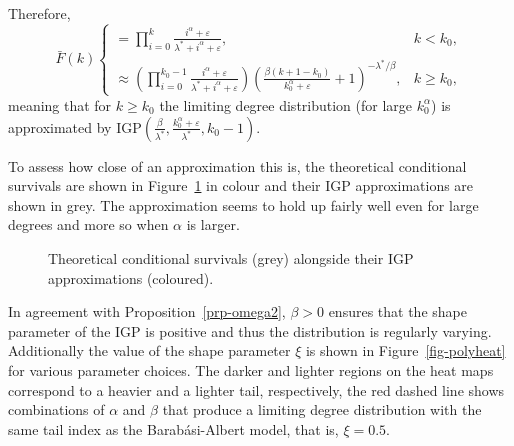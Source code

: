 \documentclass[
  sn-basic,
]{sn-jnl}
\theoremstyle{plain}
\theoremstyle{plain}
\theoremstyle{remark}
\begin{document}
Therefore, \[
\bar F(k) 
\begin{cases}
=\prod_{i=0}^{k}\frac{i^\alpha + \varepsilon}{\lambda^*+i^\alpha + \varepsilon},&k<k_0,\\
\approx \left(\prod_{i=0}^{k_0-1}\frac{i^\alpha + \varepsilon}{\lambda^*+i^\alpha + \varepsilon}\right) \left(\frac{\beta(k+1-k_0)}{k_0^{\alpha}+\varepsilon} + 1\right)^{-\lambda^*/\beta},&k\ge k_0,
\end{cases}
\] meaning that for \(k\ge k_0\) the limiting degree distribution (for
large \(k_0^\alpha\)) is approximated by
\(\text{IGP}\left(\frac{\beta}{\lambda^*}, \frac{k_0^\alpha + \varepsilon}{\lambda^*},k_0-1\right)\).

To assess how close of an approximation this is, the theoretical
conditional survivals are shown in Figure~\ref{fig-approx_surv} in
colour and their IGP approximations are shown in grey. The approximation
seems to hold up fairly well even for large degrees and more so when
\(\alpha\) is larger.

\begin{figure}


\caption{\label{fig-approx_surv}Theoretical conditional survivals (grey)
alongside their IGP approximations (coloured).}

\end{figure}%

In agreement with Proposition~\ref{prp-omega2}, \(\beta>0\) ensures that
the shape parameter of the IGP is positive and thus the distribution is
regularly varying. Additionally the value of the shape parameter \(\xi\)
is shown in Figure~\ref{fig-polyheat} for various parameter choices. The
darker and lighter regions on the heat maps correspond to a heavier and
a lighter tail, respectively, the red dashed line shows combinations of
\(\alpha\) and \(\beta\) that produce a limiting degree distribution
with the same tail index as the Barabási-Albert model, that is,
\(\xi=0.5\).
\end{document}
